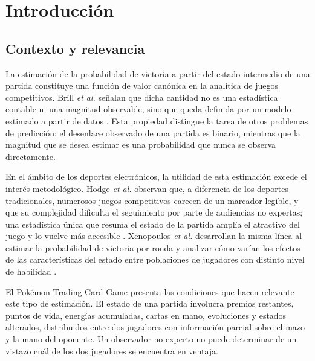 %
\section{Introducción}
\label{sec:introduccion}

\subsection{Contexto y relevancia}
\label{subsec:contexto}

La estimación de la probabilidad de victoria a partir del estado
intermedio de una partida constituye una función de valor canónica en la
analítica de juegos competitivos. Brill \textit{et al.} señalan que dicha
cantidad no es una estadística contable ni una magnitud observable, sino
que queda definida por un modelo estimado a partir de datos
\cite{brill_winprob_2026}. Esta propiedad distingue la tarea de otros
problemas de predicción: el desenlace observado de una partida es binario,
mientras que la magnitud que se desea estimar es una probabilidad que
nunca se observa directamente.


En el ámbito de los deportes electrónicos, la utilidad de esta estimación
excede el interés metodológico. Hodge \textit{et al.} observan que, a
diferencia de los deportes tradicionales, numerosos juegos competitivos
carecen de un marcador legible, y que su complejidad dificulta el
seguimiento por parte de audiencias no expertas; una estadística única que
resuma el estado de la partida amplía el atractivo del juego y lo vuelve
más accesible \cite{hodge_winprediction_2021}. Xenopoulos \textit{et al.}
desarrollan la misma línea al estimar la probabilidad de victoria por ronda
y analizar cómo varían los efectos de las características del estado entre
poblaciones de jugadores con distinto nivel de habilidad
\cite{xenopoulos_winprob_2022}.

El Pok\'emon Trading Card Game presenta las condiciones que hacen relevante
este tipo de estimación.  El estado de una partida involucra premios
restantes, puntos de vida, energías acumuladas, cartas en mano, evoluciones
y estados alterados, distribuidos entre dos jugadores con información
parcial sobre el mazo y la mano del oponente. Un observador no experto no
puede determinar de un vistazo cuál de los dos jugadores se encuentra en
ventaja.


